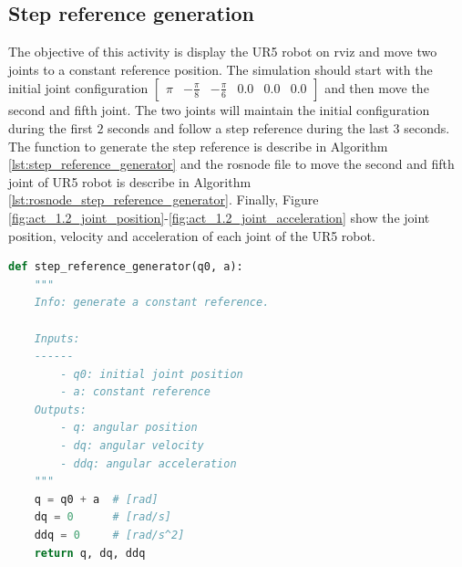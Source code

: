 \subsection{Step reference generation}
The objective of this activity is display the UR5 robot on rviz and move two joints to a constant reference position. The simulation should start with the initial joint configuration $\begin{bmatrix} \pi & -\frac{\pi}{8} & -\frac{\pi}{6} & 0.0 & 0.0 & 0.0 \end{bmatrix}$ and then move the second and fifth joint. The two joints will maintain the initial configuration during the first $2$ seconds and follow a step reference during the last $3$ seconds. The function to generate the step reference is describe in Algorithm \ref{lst:step_reference_generator} and the rosnode file to move the second and fifth joint of UR5 robot is describe in Algorithm \ref{lst:rosnode_step_reference_generator}. Finally, Figure \ref{fig:act_1.2_joint_position}-\ref{fig:act_1.2_joint_acceleration} show the joint position, velocity and acceleration of each joint of the UR5 robot.

\begin{lstlisting}[language=Python,caption=Function to generate step reference., label={lst:step_reference_generator}]
def step_reference_generator(q0, a):
    """
    Info: generate a constant reference.

    Inputs:
    ------
        - q0: initial joint position
        - a: constant reference
    Outputs:
        - q: angular position
        - dq: angular velocity
        - ddq: angular acceleration
    """
    q = q0 + a  # [rad]
    dq = 0      # [rad/s]
    ddq = 0     # [rad/s^2]
    return q, dq, ddq
\end{lstlisting}



